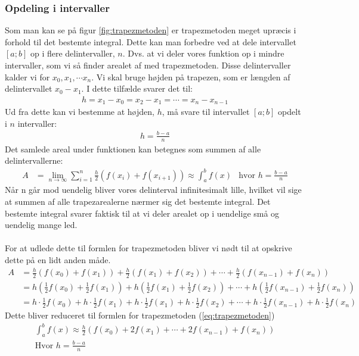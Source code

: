 \documentclass[12pt]{article}
\numberwithin{equation}{section}
\begin{document}
\subsubsection{Opdeling i intervaller}
\label{sec:opdelingtrapezmetoden}
Som man kan se på figur \ref{fig:trapezmetoden} er trapezmetoden meget upræcis i forhold til det bestemte integral. Dette kan man forbedre ved at dele intervallet $[a;b]$ op i flere delintervaller, $n$. Dvs. at vi deler vores funktion op i mindre intervaller, som vi så finder arealet af med trapezmetoden. Disse delintervaller kalder vi for $x_0, x_1, \cdots x_n$. Vi skal bruge højden på trapezen, som er længden af delintervallet $x_0 - x_1$. I dette tilfælde svarer det til:
\begin{align}
h = x_1-x_0 = x_2-x_1 = \cdots = x_n - x_{n-1}
\end{align}
Ud fra dette kan vi bestemme at højden, $h$, må svare til intervallet $[a;b]$ opdelt i $n$ intervaller:
\begin{align}
h=\frac{b-a}{n}
\end{align}
Det samlede areal under funktionen kan betegnes som summen af alle delintervallerne:
\begin{align}
A &= \lim\limits_{n \rightarrow \infty} \sum_{i=1}^{n} \frac{h}{2}(f(x_{i}) + f(x_{i+1}))
\approx \int_{a}^{b}f(x) &\text{hvor }h=\frac{b-a}{n}
\end{align}
Når n går mod uendelig bliver vores delinterval infinitesimalt lille, hvilket vil sige at summen af alle trapezarealerne nærmer sig det bestemte integral. Det bestemte integral svarer faktisk til at vi deler arealet op i uendelige små og uendelig mange led.
\\\\
For at udlede dette til formlen for trapezmetoden bliver vi nødt til at opskrive dette på en lidt anden måde.
\begin{align}
A &= \frac{h}{2}(f(x_0)+ f(x_1)) + \frac{h}{2}(f(x_1)+ f(x_2)) + \cdots + \frac{h}{2}(f(x_{n-1})+ f(x_n)) \nonumber
\\ &= h(\frac{1}{2}f(x_0) + \frac{1}{2}f(x_1)) + h(\frac{1}{2}f(x_1) + \frac{1}{2}f(x_2)) + \cdots + h(\frac{1}{2}f(x_{n-1}) + \frac{1}{2}f(x_n)) \nonumber
\\ &= h \cdot \frac{1}{2}f(x_0) + h \cdot \frac{1}{2}f(x_1) + h \cdot \frac{1}{2}f(x_1) + h \cdot \frac{1}{2}f(x_2) + \cdots + h \cdot \frac{1}{2}f(x_{n-1}) + h \cdot \frac{1}{2}f(x_n) \nonumber
\end{align}
Dette bliver reduceret til formlen for trapezmetoden (\ref{eq:trapezmetoden})
\begin{align}
\label{eq:trapezmetoden}
\boxed{\int_{a}^{b}f(x) \approx \frac{h}{2}(f(x_0) + 2f(x_1) + \cdots + 2f(x_{n-1}) + f(x_n))} \\ \text{Hvor } h=\frac{b-a}{n} \nonumber
\end{align}
\end{document}
